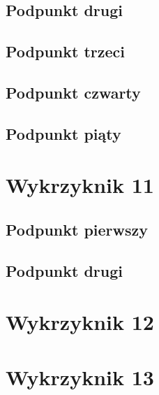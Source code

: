 \documentclass[a4paper,12pt]{article}
\begin{document}
    	\subsection{Podpunkt drugi}
    	\subsection{Podpunkt trzeci}
    	\subsection{Podpunkt czwarty}
    	\subsection{Podpunkt piąty}
    \section{Wykrzyknik 11}
    	\subsection{Podpunkt pierwszy}
    	\subsection{Podpunkt drugi}
    \section{Wykrzyknik 12}
    \section{Wykrzyknik 13}
    
\end{document}
